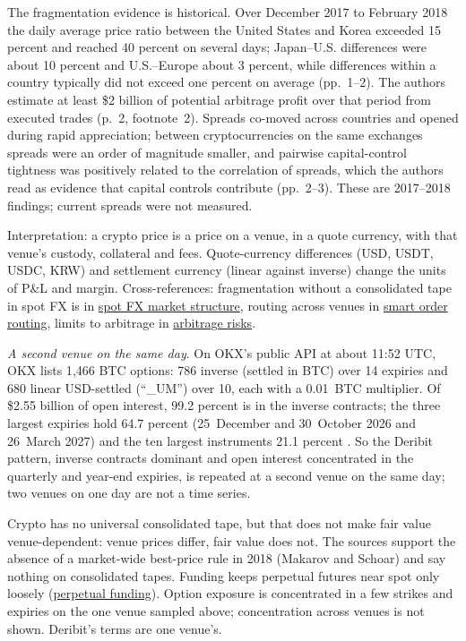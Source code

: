 \begin{qfdefinition}
 The fragmentation evidence is historical. Over December 2017 to February 2018 the daily average price ratio between the United States and Korea exceeded 15 percent and reached 40 percent on several days; Japan--U.S. differences were about 10 percent and U.S.--Europe about 3 percent, while differences within a country typically did not exceed one percent on average (pp.~1--2). The authors estimate at least \$2 billion of potential arbitrage profit over that period from executed trades (p.~2, footnote~2). Spreads co-moved across countries and opened during rapid appreciation; between cryptocurrencies on the same exchanges spreads were an order of magnitude smaller, and pairwise capital-control tightness was positively related to the correlation of spreads, which the authors read as evidence that capital controls contribute (pp.~2--3). These are 2017--2018 findings; current spreads were not measured.

 Interpretation: a crypto price is a price on a venue, in a quote currency, with that venue's custody, collateral and fees. Quote-currency differences (USD, USDT, USDC, KRW) and settlement currency (linear against inverse) change the units of P\&L and margin. Cross-references: fragmentation without a consolidated tape in spot FX is in \hyperref[def:fx-market-structure]{spot FX market structure}, routing across venues in \hyperref[def:smart-order-routing]{smart order routing}, limits to arbitrage in \hyperref[res:arbitrage-risks]{arbitrage risks}.

\emph{A second venue on the same day}. On OKX's public API at about 11:52 UTC, OKX lists 1{,}466 BTC options: 786 inverse (settled in BTC) over 14 expiries and 680 linear USD-settled (``\_UM'') over 10, each with a 0.01~BTC multiplier. Of \$2.55 billion of open interest, 99.2 percent is in the inverse contracts; the three largest expiries hold 64.7 percent (25~December and 30~October 2026 and 26~March 2027) and the ten largest instruments 21.1 percent \citep[\nolinkurl{public/instruments} and \nolinkurl{public/open-interest}, BTC-USD options, 17 October 2026]{okx-api-2026}. So the Deribit pattern, inverse contracts dominant and open interest concentrated in the quarterly and year-end expiries, is repeated at a second venue on the same day; two venues on one day are not a time series.

 Crypto has no universal consolidated tape, but that does not make fair value venue-dependent: venue prices differ, fair value does not. The sources support the absence of a market-wide best-price rule in 2018 (Makarov and Schoar) and say nothing on consolidated tapes. Funding keeps perpetual futures near spot only loosely (\hyperref[mech:perpetual-funding]{perpetual funding}). Option exposure is concentrated in a few strikes and expiries on the one venue sampled above; concentration across venues is not shown. Deribit's terms are one venue's.


\end{qfdefinition}
